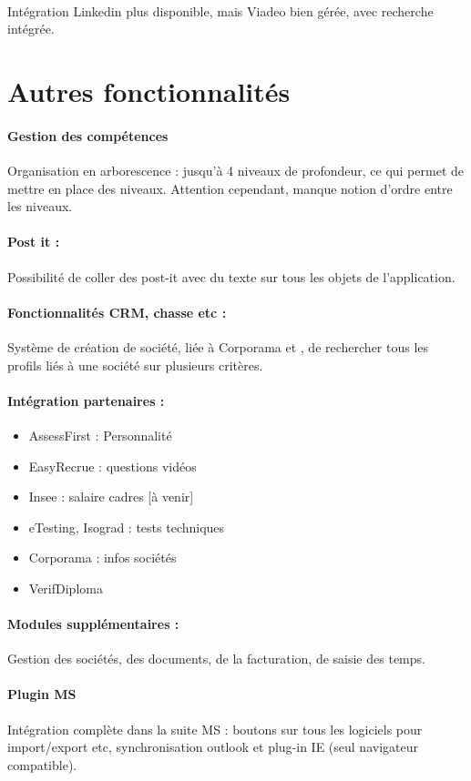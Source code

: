 \documentclass[12pt,twoside]{scrreprt}
\begin{document}
\paragraph{} Intégration Linkedin plus disponible, mais Viadeo bien gérée, avec recherche intégrée.


\section{Autres fonctionnalités}
\paragraph{Gestion des compétences} Organisation en arborescence : jusqu'à 4 niveaux de profondeur, ce qui permet de mettre en place des niveaux. Attention cependant, manque notion d'ordre entre les niveaux.
\paragraph{Post it :} Possibilité de coller des post-it avec du texte sur tous les objets de l'application.
\paragraph{Fonctionnalités CRM, chasse etc :} Système de création de société, liée à Corporama et , de rechercher tous les profils liés à une société sur plusieurs critères.
\paragraph{Intégration partenaires :} \begin{itemize}
	\item AssessFirst : Personnalité
	\item EasyRecrue : questions vidéos
	\item Insee : salaire cadres [à venir]
	\item eTesting, Isograd : tests techniques
	\item Corporama : infos sociétés
	\item VerifDiploma
\end{itemize}

\paragraph{Modules supplémentaires :} Gestion des sociétés, des documents, de la facturation, de saisie des temps.

\paragraph{Plugin MS} Intégration complète dans la suite MS : boutons sur tous les logiciels pour import/export etc, synchronisation outlook et plug-in IE (seul navigateur compatible).
\end{document}
